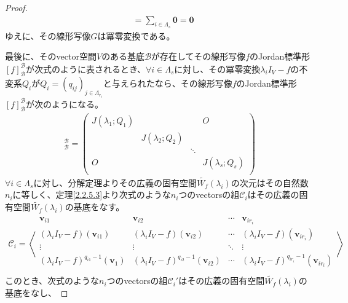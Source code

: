 \documentclass[dvipdfmx]{jsarticle}
\begin{document}
\begin{proof}
\begin{align*}
&= \sum_{i \in \varLambda_{s}} \mathbf{0} = \mathbf{0}
\end{align*}
ゆえに、その線形写像$G$は冪零変換である。\par
最後に、そのvector空間$V$のある基底$\mathcal{B}$が存在してその線形写像$f$のJordan標準形$[f]_{\mathcal{B}}^{\mathcal{B}}$が次式のように表されるとき、$\forall i \in \varLambda_{s}$に対し、その冪零変換$\lambda_{i}I_{V} - f$の不変系$Q_{i}$が$Q_{i} = \left( q_{ij} \right)_{j \in \varLambda_{r_{i}}}$と与えられたなら、その線形写像$f$のJordan標準形$[f]_{\mathcal{B}}^{\mathcal{B}}$が次のようになる。
\begin{align*}
[f]_{\mathcal{B}}^{\mathcal{B}} = \begin{pmatrix}
J\left( \lambda_{1};Q_{1} \right) & \  & \  & O \\
\  & J\left( \lambda_{2};Q_{2} \right) & \  & \  \\
\  & \  & \ddots & \  \\
O & \  & \  & J\left( \lambda_{s};Q_{s} \right) \\
\end{pmatrix}
\end{align*}
$\forall i \in \varLambda_{s}$に対し、分解定理よりその広義の固有空間$\widetilde{W_{f}}\left( \lambda_{i} \right)$の次元はその自然数$n_{i}$に等しく、定理\ref{2.2.5.3}より次式のような$n_{i}$つのvectorsの組$\mathcal{C}_{i}$はその広義の固有空間$\widetilde{W_{f}}\left( \lambda_{i} \right)$の基底をなす。
\begin{align*}
\mathcal{C}_{i} = \left\langle \begin{matrix}
\mathbf{v}_{i1} & \mathbf{v}_{i2} & \cdots & \mathbf{v}_{ir_{i}} \\
\left( \lambda_{i}I_{V} - f \right)\left( \mathbf{v}_{i1} \right) & \left( \lambda_{i}I_{V} - f \right)\left( \mathbf{v}_{i2} \right) & \cdots & \left( \lambda_{i}I_{V} - f \right)\left( \mathbf{v}_{ir_{i}} \right) \\
 \vdots & \vdots & \ddots & \vdots \\
\left( \lambda_{i}I_{V} - f \right)^{q_{i1} - 1}\left( \mathbf{v}_{1} \right) & \left( \lambda_{i}I_{V} - f \right)^{q_{i2} - 1}\left( \mathbf{v}_{i2} \right) & \cdots & \left( \lambda_{i}I_{V} - f \right)^{q_{ir_{i}} - 1}\left( \mathbf{v}_{ir_{i}} \right) \\
\end{matrix} \right\rangle
\end{align*}
このとき、次式のような$n_{i}$つのvectorsの組$\mathcal{C}_{i}'$はその広義の固有空間$\widetilde{W_{f}}\left( \lambda_{i} \right)$の基底をなし、

\end{proof}
\end{document}
